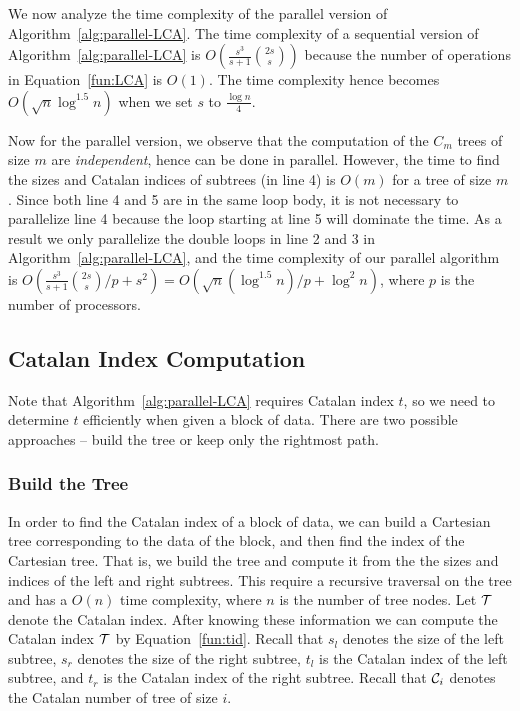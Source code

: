 We now analyze the time complexity of the parallel version of
Algorithm~\ref{alg:parallel-LCA}.  The time complexity of a sequential
version of Algorithm~\ref{alg:parallel-LCA} is $O(\frac{s^3}{s+1}
\binom{2s}{s})$ because the number of operations in
Equation~\ref{fun:LCA} is $O(1)$.  The time complexity hence becomes
$O(\sqrt{n} \log ^{1.5} n)$ when we set $s$ to $\frac{\log n}{4}$.

Now for the parallel version, we observe that the computation of the
$C_m$ trees of size $m$ are {\em independent}, hence can be done in
parallel.  However, the time to find the sizes and Catalan indices of
subtrees (in line 4) is $O(m)$ for a tree of size $m$.  Since both
line 4 and 5 are in the same loop body, it is not necessary to
parallelize line 4 because the loop starting at line 5 will dominate
the time.  As a result we only parallelize the double loops in line 2
and 3 in Algorithm~\ref{alg:parallel-LCA}, and the time complexity of
our parallel algorithm is $O(\frac{s^3}{s+1} \binom{2s}{s} / p + s^2)
= O(\sqrt{n} (\log ^{1.5} n) / p + \log^2 n )$, where $p$ is the
number of processors.



\subsection{Catalan Index Computation}

Note that Algorithm~\ref{alg:parallel-LCA} requires Catalan index $t$,
so we need to determine $t$ efficiently when given a block of data.
There are two possible approaches -- build the tree or keep only the
rightmost path.


\subsubsection{Build the Tree}

In order to find the Catalan index of a block of data, we can build a
Cartesian tree corresponding to the data of the block, and then find
the index of the Cartesian tree.  That is, we build the tree and
compute it from the the sizes and indices of the left and right
subtrees.  This require a recursive traversal on the tree and has a
$O(n)$ time complexity, where $n$ is the number of tree nodes.  Let
$\cal T$ denote the Catalan index.  After knowing these information we
can compute the Catalan index $\cal T$ by Equation~\ref{fun:tid}.
Recall that $s_l$ denotes the size of the left subtree, $s_r$ denotes
the size of the right subtree, $t_l$ is the Catalan index of the left
subtree, and $t_r$ is the Catalan index of the right subtree.  Recall
that ${\cal C}_i$ denotes the Catalan number of tree of size $i$.

